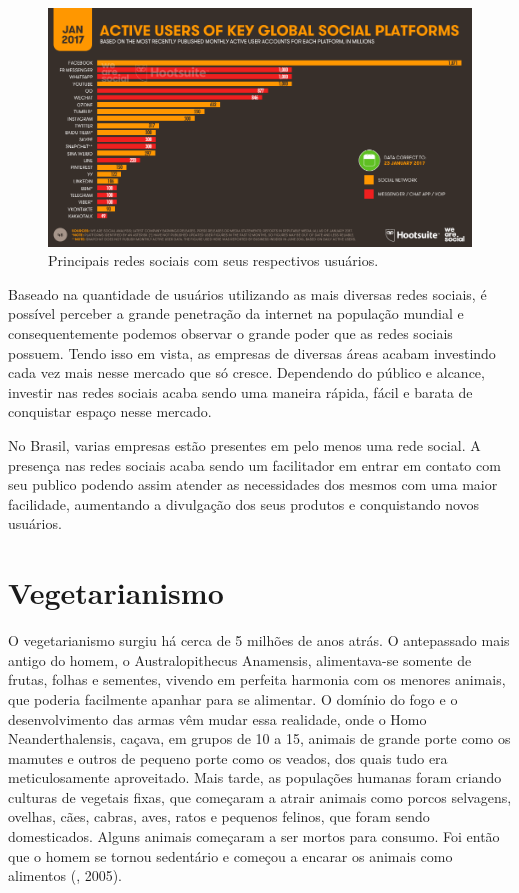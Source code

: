 \begin{figure}[H]
	\caption{\label{fig:figura5}Principais redes sociais com seus respectivos usuários.}
	\centering
	\includegraphics[scale=0.5]{imagens/figura5.png}
\end{figure}

Baseado na quantidade de usuários utilizando as mais diversas redes sociais, é possível perceber a grande penetração da internet na população mundial e consequentemente podemos observar o grande poder que as redes sociais possuem. Tendo isso em vista, as empresas de diversas áreas acabam investindo cada vez mais nesse mercado que só cresce. Dependendo do público e alcance, investir nas redes sociais acaba sendo uma maneira rápida, fácil e barata de conquistar espaço nesse mercado.

No Brasil, varias empresas estão presentes em pelo menos uma rede social. A presença nas redes sociais acaba sendo um facilitador em entrar em contato com seu publico podendo assim atender as necessidades dos mesmos com uma maior facilidade, aumentando a divulgação dos seus produtos e conquistando novos usuários.

\section{Vegetarianismo}

O vegetarianismo surgiu há cerca de 5 milhões de anos atrás. O
antepassado mais antigo do homem, o Australopithecus Anamensis, alimentava-se
somente de frutas, folhas e sementes, vivendo em perfeita harmonia com os
menores animais, que poderia facilmente apanhar para se alimentar. O domínio do
fogo e o desenvolvimento das armas vêm mudar essa realidade, onde o Homo
Neanderthalensis, caçava, em grupos de 10 a 15, animais de grande porte como os
mamutes e outros de pequeno porte como os veados, dos quais tudo era
meticulosamente aproveitado. Mais tarde, as populações humanas foram criando
culturas de vegetais fixas, que começaram a atrair animais como porcos selvagens,
ovelhas, cães, cabras, aves, ratos e pequenos felinos, que foram sendo
domesticados. Alguns animais começaram a ser mortos para consumo. Foi então
que o homem se tornou sedentário e começou a encarar os animais como alimentos
(\citeauthor{rodrigues2005}, 2005).


